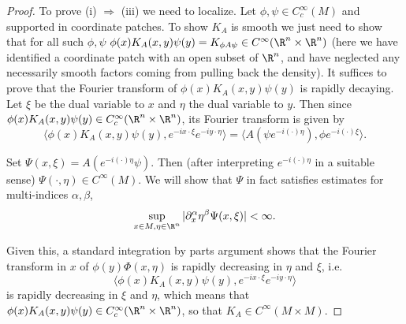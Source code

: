 \documentclass[12pt]{article}
\begin{document}
\begin{proof}
To prove (i) $\Rightarrow$ (iii) we need to localize. Let $\phi,\psi \in C_c^\infty(M)$ and supported in coordinate patches. To show $K_A$ is smooth we just need to show that for all such $\phi,\psi$ $\phi(x)K_A(x,y)\psi(y) = K_{\phi A\psi} \in C^\infty(\R^n \times \R^n)$ (here we have identified a coordinate patch with an open subset of $\R^n$, and have neglected any necessarily smooth factors coming from pulling back the density). It suffices to prove that the Fourier transform of $\phi(x)K_A(x,y)\psi(y)$ is rapidly decaying. Let $\xi$ be the dual variable to $x$ and $\eta$ the dual variable to $y$. Then since $\phi(x)K_A(x,y)\psi(y) \in C_c^\infty(\R^n \times \R^n)$, its Fourier transform is given by
\[\langle \phi(x)K_A(x,y)\psi(y),e^{-ix\cdot \xi}e^{-iy\cdot \eta}\rangle = \langle A(\psi e^{-i(\cdot)\eta}),\phi e^{-i(\cdot)\xi}\rangle.\]

Set $\Psi(x,\xi) = A(e^{-i(\cdot)\eta}\psi)$. Then (after interpreting $e^{-i(\cdot)\eta}$ in a suitable sense) $\Psi(\cdot,\eta) \in C^\infty(M)$. We will show that $\Psi$ in fact satisfies estimates for multi-indices $\alpha,\beta$,
\begin{equation}\label{est}\sup_{x \in M, \eta \in \R^n}|\partial^{\alpha}_x\eta^{\beta}\Psi(x,\xi)| < \infty.\end{equation}

Given this, a standard integration by parts argument shows that the Fourier transform in $x$ of $\phi(y)\Phi(x,\eta)$ is rapidly decreasing in $\eta$ and $\xi$, i.e.
\[\langle \phi(x)K_A(x,y)\psi(y),e^{-ix\cdot \xi}e^{-iy\cdot \eta}\rangle\] is rapidly decreasing in $\xi$ and $\eta$, which means that $\phi(x)K_A(x,y)\psi(y) \in C_c^\infty(\R^n\times \R^n)$, so that $K_A \in C^\infty(M\times M)$.


\end{proof}
\end{document}
